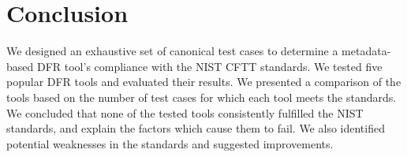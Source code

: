 \section{Conclusion}

We designed an exhaustive set of canonical test cases to determine a metadata-based DFR tool's compliance with the NIST CFTT standards.
We tested five popular DFR tools and evaluated their results.
We presented a comparison of the tools based on the number of test cases for which each tool meets the standards.
We concluded that none of the tested tools consistently fulfilled the NIST standards, and explain the factors which cause them to fail.
We also identified potential weaknesses in the standards and suggested improvements.

